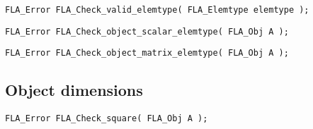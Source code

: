 
\begin{flaspec}
\begin{verbatim}
FLA_Error FLA_Check_valid_elemtype( FLA_Elemtype elemtype );
\end{verbatim}
\end{flaspec}


\begin{flaspec}
\begin{verbatim}
FLA_Error FLA_Check_object_scalar_elemtype( FLA_Obj A );
\end{verbatim}
\end{flaspec}


\begin{flaspec}
\begin{verbatim}
FLA_Error FLA_Check_object_matrix_elemtype( FLA_Obj A );
\end{verbatim}
\end{flaspec}




\subsection{Object dimensions}


\begin{flaspec}
\begin{verbatim}
FLA_Error FLA_Check_square( FLA_Obj A );
\end{verbatim}
\end{flaspec}

